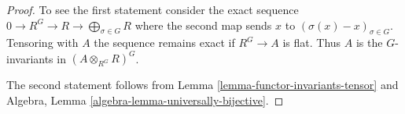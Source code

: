 \documentclass[10pt,a4paper]{amsart}
\theoremstyle{plain}
\theoremstyle{definition}
\theoremstyle{remark}
\numberwithin{equation}{subsection}
\begin{document}
\begin{proof}
To see the first statement consider the
exact sequence $0 \to R^G \to R \to \bigoplus_{\sigma \in G} R$
where the second map sends $x$ to $(\sigma(x) - x)_{\sigma \in G}$.
Tensoring with $A$ the sequence remains exact if $R^G \to A$ is flat.
Thus $A$ is the $G$-invariants in $(A \otimes_{R^G} R)^G$.

\medskip\noindent
The second statement follows from Lemma \ref{lemma-functor-invariants-tensor}
and Algebra, Lemma \ref{algebra-lemma-universally-bijective}.
\end{proof}
\end{document}
